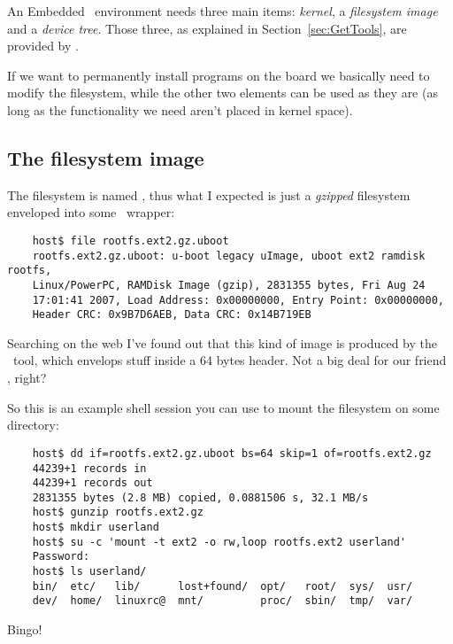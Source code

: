 An Embedded \Linux\ environment needs three main items: \emph{kernel}, a
\emph{filesystem image} and a \emph{device tree}. Those three, as
explained in Section~\ref{sec:GetTools}, are provided by
.

If we want to permanently install programs on the board we basically need
to modify the filesystem, while the other two elements can be used as they
are (as long as the functionality we need aren't placed in kernel space).

\subsection{The filesystem image}

    The filesystem is named , thus what I
    expected is just a \emph{gzipped}  filesystem enveloped
    into some \uBoot\ wrapper:

\begin{verbatim}
    host$ file rootfs.ext2.gz.uboot
    rootfs.ext2.gz.uboot: u-boot legacy uImage, uboot ext2 ramdisk rootfs,
    Linux/PowerPC, RAMDisk Image (gzip), 2831355 bytes, Fri Aug 24
    17:01:41 2007, Load Address: 0x00000000, Entry Point: 0x00000000,
    Header CRC: 0x9B7D6AEB, Data CRC: 0x14B719EB
\end{verbatim}

    Searching on the web I've found out that this kind of image is
    produced by the \mkimage\ tool, which envelops stuff inside a 64 bytes
    header. Not a big deal for our friend , right?

    So this is an example shell session you can use to mount the
    filesystem on some directory:
\begin{verbatim}
    host$ dd if=rootfs.ext2.gz.uboot bs=64 skip=1 of=rootfs.ext2.gz
    44239+1 records in
    44239+1 records out
    2831355 bytes (2.8 MB) copied, 0.0881506 s, 32.1 MB/s
    host$ gunzip rootfs.ext2.gz
    host$ mkdir userland
    host$ su -c 'mount -t ext2 -o rw,loop rootfs.ext2 userland'
    Password:
    host$ ls userland/
    bin/  etc/   lib/      lost+found/  opt/   root/  sys/  usr/
    dev/  home/  linuxrc@  mnt/         proc/  sbin/  tmp/  var/
\end{verbatim}
    Bingo!


